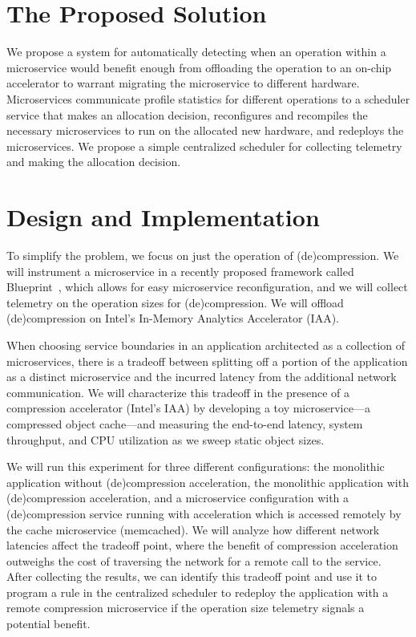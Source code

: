\documentclass[letterpaper,twocolumn,10pt]{article}
\begin{document}
\section{The Proposed Solution}
We propose a system for automatically detecting when an operation within a microservice would benefit enough from offloading the operation to an on-chip accelerator to warrant migrating the microservice to different hardware. 
Microservices communicate profile statistics for different operations to a scheduler service that makes an allocation decision, reconfigures and recompiles the necessary microservices to run on the allocated new hardware, and redeploys the microservices. 
We propose a simple centralized scheduler for collecting telemetry and making the allocation decision.

\section{Design and Implementation}
To simplify the problem, we focus on just the operation of (de)compression. 
We will instrument a microservice in a recently proposed framework called Blueprint~\cite{anand2023blueprint}, which allows for easy microservice reconfiguration, and we will collect telemetry on the operation sizes for (de)compression. 
We will offload (de)compression on Intel's In-Memory Analytics Accelerator (IAA).

When choosing service boundaries in an application architected as a collection of microservices, there is a tradeoff between splitting off a portion of the application as a distinct microservice and the incurred latency from the additional network communication. 
We will characterize this tradeoff in the presence of a compression accelerator (Intel's IAA) by developing a toy microservice---a compressed object cache---and measuring the end-to-end latency, system throughput, and CPU utilization as we sweep static object sizes. 

We will run this experiment for three different configurations: the monolithic application without (de)compression acceleration, the monolithic application with (de)compression acceleration, and a microservice configuration with a (de)compression service running with acceleration which is accessed remotely by the cache microservice (memcached). 
We will analyze how different network latencies affect the tradeoff point, where the benefit of compression acceleration outweighs the cost of traversing the network for a remote call to the service.
After collecting the results, we can identify this tradeoff point and use it to program a rule in the centralized scheduler to redeploy the application with a remote compression microservice if the operation size telemetry signals a potential benefit.
\end{document}
